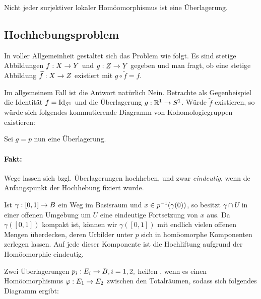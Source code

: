 \Bem{}
Nicht jeder surjektiver lokaler Homöomorphismus ist eine Überlagerung.

\subsection{Hochhebungsproblem}
In voller Allgemeinheit gestaltet sich das Problem wie folgt. Es sind stetige Abbildungen $f:X \overset{}{\rightarrow} Y$ und $g:Z \overset{}{\rightarrow} Y$ gegeben und man fragt, ob eine stetige Abbildung $\widetilde{f} : X \overset{}{\rightarrow} Z$ existiert mit $g\circ \widetilde{f} = f$.
\begin{center}
\end{center}
Im allgemeinem Fall ist die Antwort natürlich Nein. Betrachte als Gegenbeispiel die Identität $f = \text{Id}_{S^1}$ und die Überlagerung $g : \mathbb{R}^1 \overset{}{\rightarrow} S^1$. Würde $\widetilde{f}$ existieren, so würde sich folgendes kommutierende Diagramm von Kohomologiegruppen existieren:
\begin{center}
\end{center}
Sei $g = p$ nun eine Überlagerung.
\paragraph{Fakt:}
Wege lassen sich bzgl. Überlagerungen hochheben, und zwar \emph{eindeutig}, wenn de Anfangspunkt der Hochhebung fixiert wurde.
\begin{Beweis}{}
Ist $\gamma : [0,1] \overset{}{\rightarrow} B$ ein Weg im Basisraum und $x \in p^{-1}(\gamma(0))$, so besitzt $\gamma\cap U$ in einer offenen Umgebung um $U$ eine eindeutige Fortsetzung von $x$ aus. Da $\gamma([0,1])$ kompakt ist, können wir $\gamma([0,1])$ mit endlich vielen offenen Mengen überdecken, deren Urbilder unter $p$ sich in homöomorphe Komponenten zerlegen lassen. Auf jede dieser Komponente ist die Hochliftung aufgrund der Homöomorphie eindeutig.
\end{Beweis}

\Def{}
Zwei Überlagerungen $p_i : E_i \overset{}{\rightarrow} B, i = 1,2,$ heißen , wenn es einen Homöomorphismus $\varphi : E_1 \overset{}{\rightarrow} E_2$ zwischen den Totalräumen, sodass sich folgendes Diagramm ergibt:
\begin{center}
\end{center}

